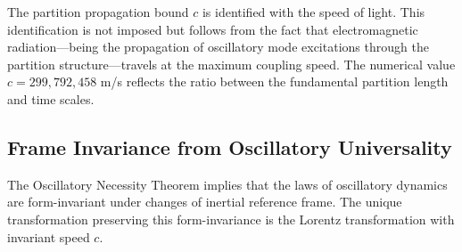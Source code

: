 \begin{remark}
The partition propagation bound $c$ is identified with the speed of light. This identification is not imposed but follows from the fact that electromagnetic radiation---being the propagation of oscillatory mode excitations through the partition structure---travels at the maximum coupling speed. The numerical value $c = 299{,}792{,}458$ m/s reflects the ratio between the fundamental partition length and time scales.
\end{remark}

\subsection{Frame Invariance from Oscillatory Universality}

\begin{theorem}
\label{thm:lorentz-invariance}
The Oscillatory Necessity Theorem implies that the laws of oscillatory dynamics are form-invariant under changes of inertial reference frame. The unique transformation preserving this form-invariance is the Lorentz transformation with invariant speed $c$.
\end{theorem}

